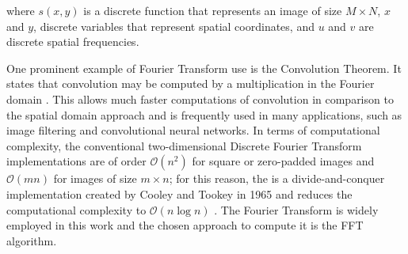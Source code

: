 \noindent where $s(x,y)$ is a discrete function that represents an image of size $M \times N$, $x$ and $y$, discrete variables that represent spatial coordinates, and $u$ and $v$ are discrete spatial frequencies. 

One prominent example of Fourier Transform use is the Convolution Theorem. It states that convolution may be computed by a multiplication in the Fourier domain \cite{brigham1988fast}. This allows much faster computations of convolution in comparison to the spatial domain approach and is frequently used in many applications, such as image filtering and convolutional neural networks. In terms of computational complexity, the conventional two-dimensional Discrete Fourier Transform implementations are of order $\mathcal{O}(n^{2})$ for square or zero-padded images and $\mathcal{O}(mn)$ for images of size $m \times n$; for this reason, the  is a divide-and-conquer implementation created by Cooley and Tookey in 1965 and reduces the computational complexity to $\mathcal{O}(n \log n)$ \cite{bracewell2000fourier}. The Fourier Transform is widely employed in this work and the chosen approach to compute it is the FFT algorithm.